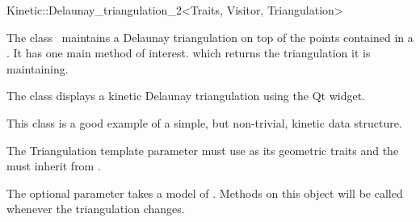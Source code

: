 

\begin{ccRefClass}{Kinetic::Delaunay_triangulation_2<Traits, Visitor, Triangulation>}  %


\ccDefinition
  
The class \ccRefName\ maintains a Delaunay triangulation on top of the
points contained in a . It has one main method
of interest.  which returns the triangulation it
is maintaining. 

The class  displays a kinetic
Delaunay triangulation using the Qt widget.

This class is a good example of a simple, but non-trivial, kinetic data structure. 

The Triangulation template parameter must use
 as its geometric traits and the
 must inherit from .

The optional  parameter takes a model of
. Methods on this object will be called
whenever the triangulation changes.



\ccTypes


\ccCreation
{}  %



\end{ccRefClass}

